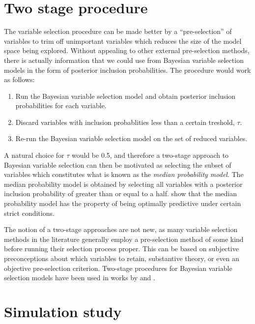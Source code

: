 \documentclass[a4paper,showframe,11pt]{report}
\begin{document}
\section{Two stage procedure}

The variable selection procedure can be made better by a ``pre-selection'' of variables to trim off unimportant variables which reduces the size of the model space being explored.
Without appealing to other external pre-selection methods, there is actually information that we could use from Bayesian variable selection models in the form of posterior inclusion probabilities.
The procedure would work as follows:

\begin{enumerate}
  \item Run the Bayesian variable selection model and obtain posterior inclusion probabilities for each variable.
  \item Discard variables with inclusion probablities less than a certain treshold, $\tau$.
  \item Re-run the Bayesian variable selection model on the set of reduced variables.
\end{enumerate}

A natural choice for $\tau$ would be 0.5, and therefore a two-stage approach to Bayesian variable selection can then be motivated as selecting the subset of variables which constitutes what is known as the \emph{median probability model}.
The median probability model is obtained by selecting all variables with a posterior inclusion probability of greater than or equal to a half.
\citet{Barbieri2004} show that the median probability model has the property of being optimally predictive under certain strict conditions. 

The notion of a two-stage approaches are not new, as many variable selection methods in the literature generally employ a pre-selection method of some kind before running their selection process proper.
This can be based on subjective preconceptions about which variables to retain, substantive theory, or even an objective pre-selection criterion.
Two-stage procedures for Bayesian variable selection models have been used in works by \citet{Fouskakis2008} and \citet{Ntzoufras2008}. 

\section{Simulation study}
\end{document}
